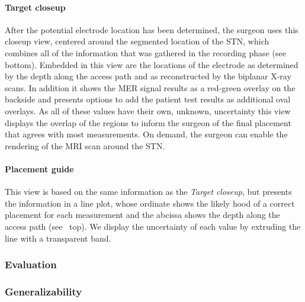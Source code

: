 \paragraph{Target closeup} After the potential electrode location has been determined, the surgeon uses this closeup view, centered around the segmented location of the STN, which combines all of the information that was gathered in the recording phase (see~ bottom). Embedded in this view are the locations of the electrode as determined by the depth along the access path and as reconstructed by the biplanar X-ray scans. In addition it shows the MER signal results as a red-green overlay on the backside and presents options to add the patient test results as additional oval overlays. As all of these values have their own, unknown, uncertainty this view displays the overlap of the regions to inform the surgeon of the final placement that agrees with most measurements. On demand, the surgeon can enable the rendering of the MRI scan around the STN.

\paragraph{Placement guide} This view is based on the same information as the \emph{Target closeup}, but presents the information in a line plot, whose ordinate shows the likely hood of a correct placement for each measurement and the abcissa shows the depth along the access path (see~ top). We display the uncertainty of each value by extruding the line with a transparent band.

\subsubsection{Evaluation}
\label{contributions:medbio:dbs:evaluation}

\subsubsection{Generalizability}
\label{contributions:medbio:dbs:generalizability}


